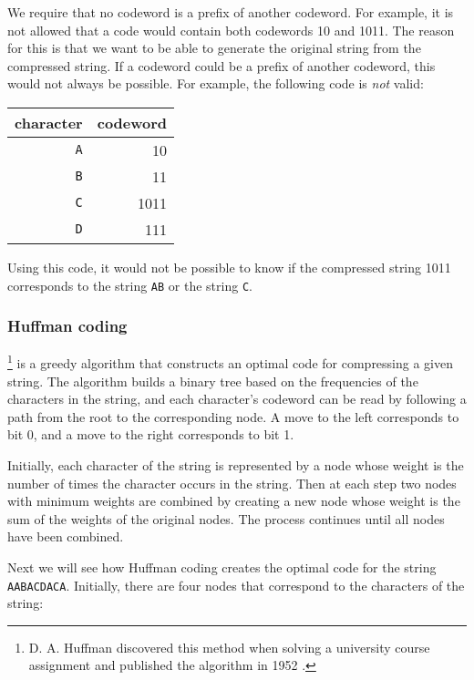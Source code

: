 We require that no codeword
is a prefix of another codeword.
For example, it is not allowed that a code
would contain both codewords 10
and 1011.
The reason for this is that we want
to be able to generate the original string
from the compressed string.
If a codeword could be a prefix of another codeword,
this would not always be possible.
For example, the following code is \emph{not} valid:
\begin{center}
\begin{tabular}{rr}
character & codeword \\
\hline
\texttt{A} & 10 \\
\texttt{B} & 11 \\
\texttt{C} & 1011 \\
\texttt{D} & 111 \\
\end{tabular}
\end{center}
Using this code, it would not be possible to know
if the compressed string 1011 corresponds to
the string \texttt{AB} or the string \texttt{C}.


\subsubsection{Huffman coding}

\footnote{D. A. Huffman discovered this method
when solving a university course assignment
and published the algorithm in 1952 \cite{huf52}.} is a greedy algorithm
that constructs an optimal code for
compressing a given string.
The algorithm builds a binary tree
based on the frequencies of the characters
in the string,
and each character's codeword can be read
by following a path from the root to
the corresponding node.
A move to the left corresponds to bit 0,
and a move to the right corresponds to bit 1.

Initially, each character of the string is
represented by a node whose weight is the
number of times the character occurs in the string.
Then at each step two nodes with minimum weights
are combined by creating
a new node whose weight is the sum of the weights
of the original nodes.
The process continues until all nodes have been combined.

Next we will see how Huffman coding creates
the optimal code for the string
\texttt{AABACDACA}.
Initially, there are four nodes that correspond
to the characters of the string:

